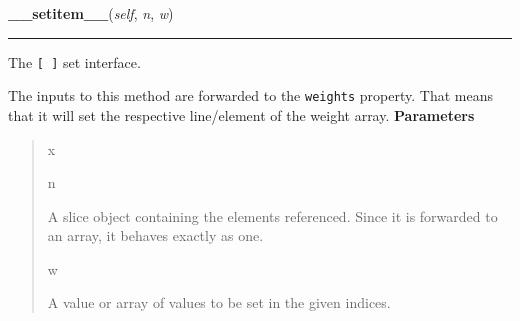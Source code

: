 \hspace{.8\funcindent}\begin{boxedminipage}{\funcwidth}

    \raggedright \textbf{\_\_setitem\_\_}(\textit{self}, \textit{n}, \textit{w})

    \vspace{-1.5ex}

    \rule{\textwidth}{0.5\fboxrule}
\setlength{\parskip}{2ex}

The \texttt{{[} {]}} set interface.

The inputs to this method are forwarded to the \texttt{weights} property.
That means that it will set the respective line/element of the weight
array.
\setlength{\parskip}{1ex}
      \textbf{Parameters}
      \vspace{-1ex}

      \begin{quote}
        \begin{Ventry}{x}

          \item[n]


A slice object containing the elements referenced. Since it is
forwarded to an array, it behaves exactly as one.
          \item[w]


A value or array of values to be set in the given indices.
        \end{Ventry}

      \end{quote}

    \end{boxedminipage}

    \label{peach:nn:base:Layer:__call__}

    \vspace{0.5ex}

